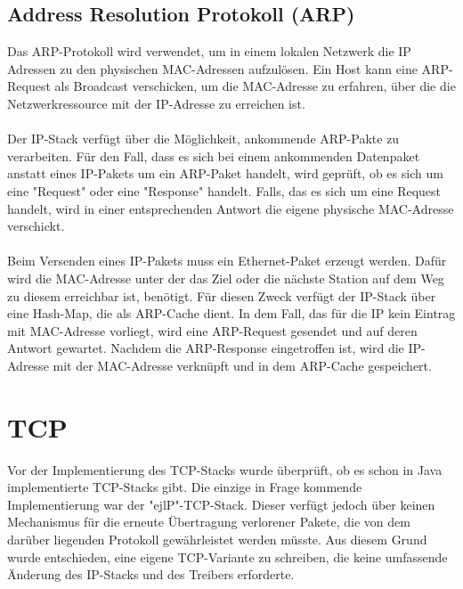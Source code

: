 \subsection{Address Resolution Protokoll (ARP)}
Das ARP-Protokoll wird verwendet, um in einem lokalen Netzwerk die IP Adressen zu den physischen MAC-Adressen aufzulösen. Ein Host kann eine ARP-Request als Broadcast verschicken, um die MAC-Adresse zu erfahren, über die die Netzwerkressource mit der IP-Adresse zu erreichen ist. \\\\
Der IP-Stack verfügt über die Möglichkeit, ankommende ARP-Pakte zu verarbeiten. Für den Fall, dass es sich bei einem ankommenden Datenpaket anstatt eines IP-Pakets um ein ARP-Paket handelt, wird geprüft, ob es sich um eine {}"Request"{} oder eine {}"Response"{} handelt. Falls, das es sich um eine Request handelt, wird in einer entsprechenden Antwort die eigene physische MAC-Adresse verschickt. \\\\
Beim Versenden eines IP-Pakets muss ein Ethernet-Paket erzeugt werden. Dafür wird die MAC-Adresse unter der das Ziel oder die nächste Station auf dem Weg zu diesem erreichbar ist, benötigt. Für diesen Zweck verfügt der IP-Stack über eine Hash-Map, die als ARP-Cache dient. In dem Fall, das für die IP kein Eintrag mit MAC-Adresse vorliegt, wird eine ARP-Request gesendet und auf deren Antwort gewartet. Nachdem die ARP-Response eingetroffen ist, wird die IP-Adresse mit der MAC-Adresse verknüpft und in dem ARP-Cache gespeichert. 


 



\section{TCP}

Vor der Implementierung des TCP-Stacks wurde überprüft, ob es schon in Java implementierte TCP-Stacks gibt. Die einzige in Frage kommende Implementierung war der "{}ejlP"{}-TCP-Stack. Dieser verfügt jedoch über keinen Mechanismus für die erneute Übertragung verlorener Pakete, die von dem darüber liegenden Protokoll gewährleistet werden müsste. Aus diesem Grund wurde entschieden, eine eigene TCP-Variante zu schreiben, die keine umfassende Änderung des IP-Stacks und des Treibers erforderte. 



